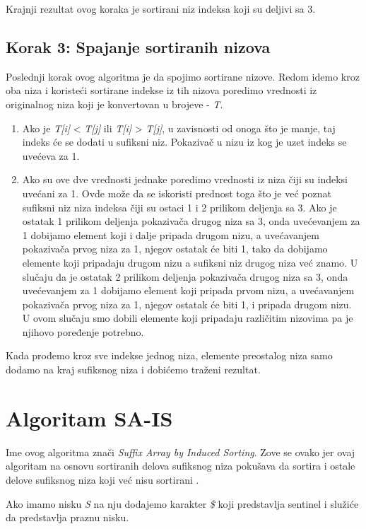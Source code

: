\documentclass{article}
\begin{document}
Krajnji rezultat ovog koraka je sortirani niz indeksa koji su deljivi sa 3.

\subsection{Korak 3: Spajanje sortiranih nizova}
Poslednji korak ovog algoritma je da spojimo sortirane nizove.
Redom idemo kroz oba niza i koristeći sortirane indekse iz tih nizova poredimo vrednosti iz originalnog niza koji je konvertovan u brojeve - \textit{T}.
\begin{enumerate}
    \item Ako je \textit{T[i]} < \textit{T[j]} ili \textit{T[i]} > \textit{T[j]}, u zavisnosti od onoga što je manje, taj indeks će se dodati u sufiksni niz. Pokazivač u nizu iz kog je uzet indeks se uvećeva za 1.
    \item Ako su ove dve vrednosti jednake poredimo vrednosti iz niza čiji su indeksi uvećani za 1. Ovde može da se iskoristi prednost toga što je već poznat sufiksni niz niza indeksa čiji su ostaci 1 i 2 prilikom deljenja sa 3. Ako je ostatak 1 prilikom deljenja pokazivača drugog niza sa 3, onda uvećevanjem za 1 dobijamo element koji i dalje pripada drugom nizu, a uvećavanjem pokazivača prvog niza za 1, njegov ostatak će biti 1, tako da dobijamo elemente koji pripadaju drugom nizu a sufiksni niz drugog niza već znamo. U slučaju da je ostatak 2 prilikom deljenja pokazivača drugog niza sa 3, onda uvećevanjem za 1 dobijamo element koji pripada prvom nizu, a uvećavanjem pokazivača prvog niza za 1, njegov ostatak će biti 1, i pripada drugom nizu. U ovom slučaju smo dobili elemente koji pripadaju različitim nizovima pa je njihovo poređenje potrebno.
\end{enumerate}

Kada prođemo kroz sve indekse jednog niza, elemente preostalog niza samo dodamo na kraj sufiksnog niza i dobićemo traženi rezultat.

\section{Algoritam SA-IS}
Ime ovog algoritma znači \textit{Suffix Array by Induced Sorting}. Zove se ovako jer ovaj algoritam na osnovu sortiranih delova sufiksnog niza pokušava da sortira i ostale delove sufiksnog niza koji već nisu sortirani \cite{sais, presentation_sais, master_sais}.

Ako imamo nisku \textit{S} na nju dodajemo karakter \textit{\$} koji predstavlja sentinel i služiće da predstavlja praznu nisku. \\\\
\end{document}
